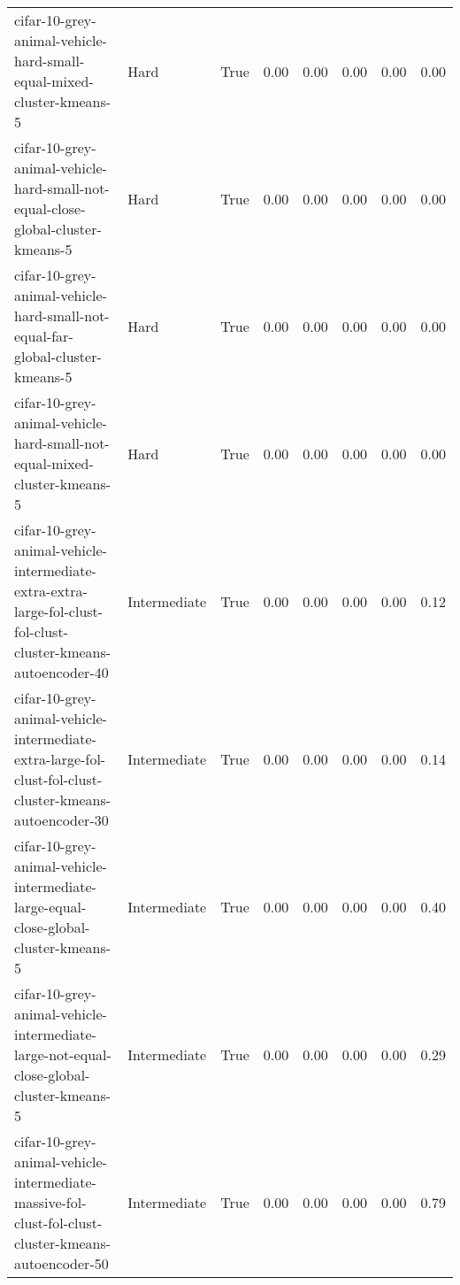 \begin{longtable}{llllllll}
                                         cifar-10-grey-animal-vehicle-hard-small-equal-mixed-cluster-kmeans-5 &         Hard &        True &                 0.00 &                 0.00 &                         0.00 &                         0.00 &                         0.00 \\
                              cifar-10-grey-animal-vehicle-hard-small-not-equal-close-global-cluster-kmeans-5 &         Hard &        True &                 0.00 &                 0.00 &                         0.00 &                         0.00 &                         0.00 \\
                                cifar-10-grey-animal-vehicle-hard-small-not-equal-far-global-cluster-kmeans-5 &         Hard &        True &                 0.00 &                 0.00 &                         0.00 &                         0.00 &                         0.00 \\
                                     cifar-10-grey-animal-vehicle-hard-small-not-equal-mixed-cluster-kmeans-5 &         Hard &        True &                 0.00 &                 0.00 &                         0.00 &                         0.00 &                         0.00 \\
cifar-10-grey-animal-vehicle-intermediate-extra-extra-large-fol-clust-fol-clust-cluster-kmeans-autoencoder-40 & Intermediate &        True &                 0.00 &                 0.00 &                         0.00 &                         0.00 &                         0.12 \\
      cifar-10-grey-animal-vehicle-intermediate-extra-large-fol-clust-fol-clust-cluster-kmeans-autoencoder-30 & Intermediate &        True &                 0.00 &                 0.00 &                         0.00 &                         0.00 &                         0.14 \\
                          cifar-10-grey-animal-vehicle-intermediate-large-equal-close-global-cluster-kmeans-5 & Intermediate &        True &                 0.00 &                 0.00 &                         0.00 &                         0.00 &                         0.40 \\
                      cifar-10-grey-animal-vehicle-intermediate-large-not-equal-close-global-cluster-kmeans-5 & Intermediate &        True &                 0.00 &                 0.00 &                         0.00 &                         0.00 &                         0.29 \\
          cifar-10-grey-animal-vehicle-intermediate-massive-fol-clust-fol-clust-cluster-kmeans-autoencoder-50 & Intermediate &        True &                 0.00 &                 0.00 &                         0.00 &                         0.00 &                         0.79 \\

\end{longtable}
